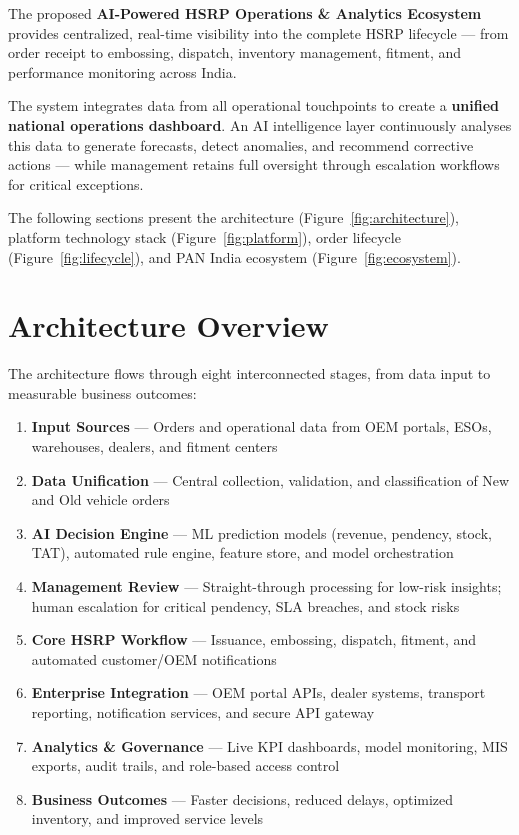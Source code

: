 \documentclass[11pt,a4paper]{article}
\begin{document}
The proposed \textbf{AI-Powered HSRP Operations \& Analytics Ecosystem} provides centralized, real-time visibility into the complete HSRP lifecycle --- from order receipt to embossing, dispatch, inventory management, fitment, and performance monitoring across India.

The system integrates data from all operational touchpoints to create a \textbf{unified national operations dashboard}. An AI intelligence layer continuously analyses this data to generate forecasts, detect anomalies, and recommend corrective actions --- while management retains full oversight through escalation workflows for critical exceptions.

The following sections present the architecture (Figure~\ref{fig:architecture}), platform technology stack (Figure~\ref{fig:platform}), order lifecycle (Figure~\ref{fig:lifecycle}), and PAN India ecosystem (Figure~\ref{fig:ecosystem}).

\section{Architecture Overview}

The architecture flows through eight interconnected stages, from data input to measurable business outcomes:

\begin{enumerate}[leftmargin=1.5em, itemsep=0.4em]
    \item \textbf{Input Sources} --- Orders and operational data from OEM portals, ESOs, warehouses, dealers, and fitment centers
    \item \textbf{Data Unification} --- Central collection, validation, and classification of New and Old vehicle orders
    \item \textbf{AI Decision Engine} --- ML prediction models (revenue, pendency, stock, TAT), automated rule engine, feature store, and model orchestration
    \item \textbf{Management Review} --- Straight-through processing for low-risk insights; human escalation for critical pendency, SLA breaches, and stock risks
    \item \textbf{Core HSRP Workflow} --- Issuance, embossing, dispatch, fitment, and automated customer/OEM notifications
    \item \textbf{Enterprise Integration} --- OEM portal APIs, dealer systems, transport reporting, notification services, and secure API gateway
    \item \textbf{Analytics \& Governance} --- Live KPI dashboards, model monitoring, MIS exports, audit trails, and role-based access control
    \item \textbf{Business Outcomes} --- Faster decisions, reduced delays, optimized inventory, and improved service levels
\end{enumerate}
\end{document}
